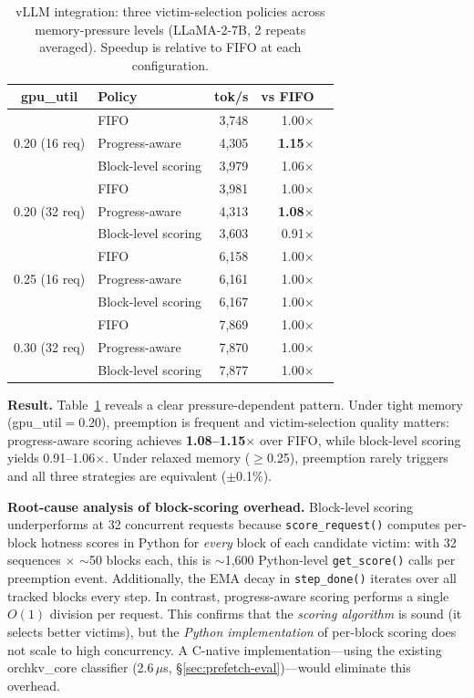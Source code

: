 \documentclass[conference]{IEEEtran}
\begin{document}
\begin{table}[t]
\centering
\caption{vLLM integration: three victim-selection policies across memory-pressure levels (LLaMA-2-7B, 2 repeats averaged). Speedup is relative to FIFO at each configuration.}
\label{tab:vllm-block}
\small
\begin{tabular}{@{}clrrr@{}}
\toprule
gpu\_util & Policy & tok/s & vs FIFO \\
\midrule
\multirow{3}{*}{0.20 (16 req)}
  & FIFO              & 3{,}748 & 1.00$\times$ \\
  & Progress-aware     & 4{,}305 & \textbf{1.15$\times$} \\
  & Block-level scoring & 3{,}979 & 1.06$\times$ \\
\midrule
\multirow{3}{*}{0.20 (32 req)}
  & FIFO              & 3{,}981 & 1.00$\times$ \\
  & Progress-aware     & 4{,}313 & \textbf{1.08$\times$} \\
  & Block-level scoring & 3{,}603 & 0.91$\times$ \\
\midrule
\multirow{3}{*}{0.25 (16 req)}
  & FIFO              & 6{,}158 & 1.00$\times$ \\
  & Progress-aware     & 6{,}161 & 1.00$\times$ \\
  & Block-level scoring & 6{,}167 & 1.00$\times$ \\
\midrule
\multirow{3}{*}{0.30 (32 req)}
  & FIFO              & 7{,}869 & 1.00$\times$ \\
  & Progress-aware     & 7{,}870 & 1.00$\times$ \\
  & Block-level scoring & 7{,}877 & 1.00$\times$ \\
\bottomrule
\end{tabular}
\end{table}

\textbf{Result.} Table~\ref{tab:vllm-block} reveals a clear pressure-dependent pattern. Under tight memory (gpu\_util$=$0.20), preemption is frequent and victim-selection quality matters: progress-aware scoring achieves \textbf{1.08--1.15$\times$} over FIFO, while block-level scoring yields 0.91--1.06$\times$. Under relaxed memory ($\geq$0.25), preemption rarely triggers and all three strategies are equivalent ($\pm$0.1\%).

\textbf{Root-cause analysis of block-scoring overhead.} Block-level scoring underperforms at 32 concurrent requests because \texttt{score\_request()} computes per-block hotness scores in Python for \emph{every} block of each candidate victim: with 32 sequences $\times$ ${\sim}$50 blocks each, this is ${\sim}$1,600 Python-level \texttt{get\_score()} calls per preemption event. Additionally, the EMA decay in \texttt{step\_done()} iterates over all tracked blocks every step. In contrast, progress-aware scoring performs a single $O(1)$ division per request. This confirms that the \emph{scoring algorithm} is sound (it selects better victims), but the \emph{Python implementation} of per-block scoring does not scale to high concurrency. A C-native implementation---using the existing orchkv\_core classifier (2.6\,$\mu$s, \S\ref{sec:prefetch-eval})---would eliminate this overhead.
\end{document}
